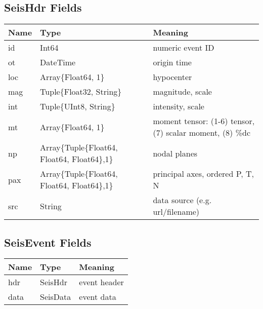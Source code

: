 \documentclass[letterpaper,11pt,english]{sphinxmanual}
\begin{document}
\subsection{SeisHdr Fields}
\label{\detokenize{src/Appendices/seisdata_fields:seishdr-fields}}

\begin{savenotes}\sphinxattablestart
\centering
\begin{tabulary}{\linewidth}[t]{|T|T|T|}
\hline
\sphinxstyletheadfamily 
Name
&\sphinxstyletheadfamily 
Type
&\sphinxstyletheadfamily 
Meaning
\\
\hline
id
&
Int64
&
numeric event ID
\\
\hline
ot
&
DateTime
&
origin time
\\
\hline
loc
&
Array\{Float64, 1\}
&
hypocenter
\\
\hline
mag
&
Tuple\{Float32, String\}
&
magnitude, scale
\\
\hline
int
&
Tuple\{UInt8, String\}
&
intensity, scale
\\
\hline
mt
&
Array\{Float64, 1\}
&
moment tensor: (1-6) tensor,
(7) scalar moment, (8) \%dc
\\
\hline
np
&
Array\{Tuple\{Float64,
Float64, Float64\},1\}
&
nodal planes
\\
\hline
pax
&
Array\{Tuple\{Float64,
Float64, Float64\},1\}
&
principal axes, ordered P, T, N
\\
\hline
src
&
String
&
data source (e.g. url/filename)
\\
\hline
\end{tabulary}
\par
\sphinxattableend\end{savenotes}


\subsection{SeisEvent Fields}
\label{\detokenize{src/Appendices/seisdata_fields:seisevent-fields}}

\begin{savenotes}\sphinxattablestart
\centering
\begin{tabulary}{\linewidth}[t]{|T|T|T|}
\hline
\sphinxstyletheadfamily 
Name
&\sphinxstyletheadfamily 
Type
&\sphinxstyletheadfamily 
Meaning
\\
\hline
hdr
&
SeisHdr
&
event header
\\
\hline
data
&
SeisData
&
event data
\\
\hline
\end{tabulary}
\par
\sphinxattableend\end{savenotes}
\end{document}
